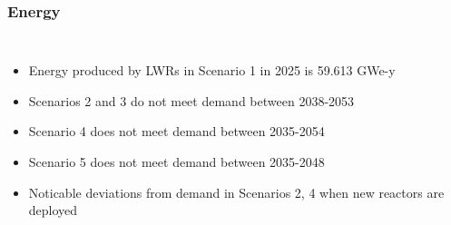 \begin{frame}
    \frametitle{Energy}
    \begin{columns}
        \column[t]{5cm}
        \begin{itemize}
            \item Energy produced by \glspl{LWR} in Scenario 1 in 2025 is 59.613 GWe-y
            \item Scenarios 2 and 3 do not meet demand between 2038-2053
            \item Scenario 4 does not meet demand between 2035-2054
            \item Scenario 5 does not meet demand between 2035-2048
            \item Noticable deviations from demand in Scenarios 2, 4 when new 
                  reactors are deployed
        \end{itemize}


\end{columns}
\end{frame}
